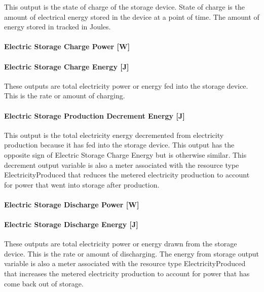 This output is the state of charge of the storage device. State of charge is the amount of electrical energy stored in the device at a point of time. The amount of energy stored in tracked in Joules.

\paragraph{Electric Storage Charge Power {[}W{]}}\label{electric-storage-charge-power-w}

\paragraph{Electric Storage Charge Energy {[}J{]}}\label{electric-storage-charge-energy-j}

These outputs are total electricity power or energy fed into the storage device. This is the rate or amount of charging.

\paragraph{Electric Storage Production Decrement Energy {[}J{]}}\label{electric-storage-production-decrement-energy-j}

This output is the total electricity energy decremented from electricity production because it has fed into the storage device. This output has the opposite sign of Electric Storage Charge Energy but is otherwise similar. This decrement output variable is also a meter associated with the resource type ElectricityProduced that reduces the metered electricity production to account for power that went into storage after production.

\paragraph{Electric Storage Discharge Power {[}W{]}}\label{electric-storage-discharge-power-w}

\paragraph{Electric Storage Discharge Energy {[}J{]}}\label{electric-storage-discharge-energy-j}

These outputs are total electricity power or energy drawn from the storage device. This is the rate or amount of discharging. The energy from storage output variable is also a meter associated with the resource type ElectricityProduced that increases the metered electricity production to account for power that has come back out of storage.


